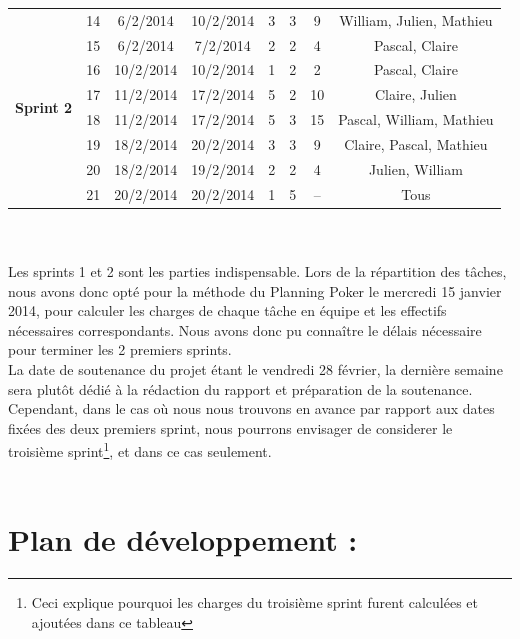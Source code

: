 \documentclass[a4paper,11pt,french]{article}
\begin{document}
\begin{tabular}{|c|c|c|c|c|c|c|c|}
\hline
&&&&&&&\\
\hline
\multirow{8}{*}{\begin{sideways}\textbf{Sprint 2}\end{sideways}}
&14 		& 6/2/2014 		& 10/2/2014 		& 3		& 3 		& 9			& William, Julien, Mathieu\\
\cline{2-8}
&15 		& 6/2/2014 		& 7/2/2014 			& 2 	& 2 		& 4			& Pascal, Claire\\
\cline{2-8}
&16 		& 10/2/2014 	& 10/2/2014 		& 1 	& 2 		& 2			& Pascal, Claire\\
\cline{2-8}
&17 		& 11/2/2014 	& 17/2/2014 		& 5 	& 2 		& 10		& Claire, Julien\\
\cline{2-8}
&18 		& 11/2/2014 	& 17/2/2014 		& 5 	& 3 		& 15		& Pascal, William, Mathieu\\
\cline{2-8}
&19 		& 18/2/2014 	& 20/2/2014 		& 3 	& 3 		& 9			& Claire, Pascal, Mathieu\\
\cline{2-8}
&20 		& 18/2/2014 	& 19/2/2014 		& 2 	& 2 		& 4			& Julien, William\\
\cline{2-8}
&21 		& 20/2/2014 	& 20/2/2014 		& 1 	& 5 		& --		& Tous\\
\hline
\end{tabular}
\\ \\

Les sprints 1 et 2 sont les parties indispensable. Lors de la répartition des tâches, nous avons donc opté pour la méthode du Planning Poker le mercredi 15 janvier 2014, pour calculer les charges de chaque tâche en équipe et les effectifs nécessaires correspondants. Nous avons donc pu connaître le délais nécessaire pour terminer les 2 premiers sprints.
\\

La date de soutenance du projet étant le vendredi 28 février, la dernière semaine sera plutôt dédié à la rédaction du rapport et préparation de la soutenance. Cependant, dans le cas où nous nous trouvons en avance par rapport aux dates fixées des deux premiers sprint, nous pourrons envisager de considerer le troisième sprint\footnote{Ceci explique pourquoi les charges du troisième sprint furent calculées et ajoutées dans ce tableau}, et dans ce cas seulement.
\\ \\

\newpage

\section{Plan de développement :}
\end{document}
